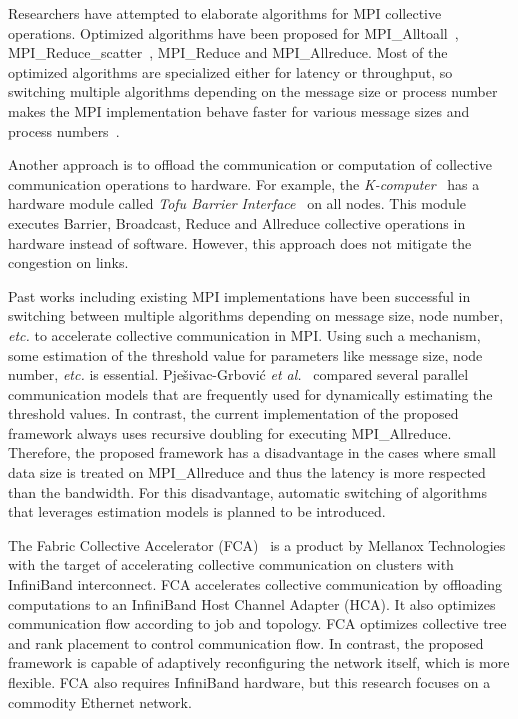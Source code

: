 Researchers have attempted to elaborate algorithms for MPI collective
operations. Optimized algorithms have been proposed for
MPI\_Alltoall~\autocite{Bruck1997},
MPI\_Reduce\_scatter~\autocite{Iannello1997}, MPI\_Reduce and MPI\_Allreduce.
Most of the optimized algorithms are specialized either for latency or
throughput, so switching multiple algorithms depending on the message size or
process number makes the MPI implementation behave faster for various message
sizes and process numbers~\autocite{Thakur2005}.

Another approach is to offload the communication or computation of collective
communication operations to hardware. For example, the
\emph{K-computer}~\autocite{Yokokawa2011} has a hardware module called
\emph{Tofu Barrier Interface}~\autocite{Ajima2012} on all nodes. This module
executes Barrier, Broadcast, Reduce and Allreduce collective operations in
hardware instead of software. However, this approach does not mitigate
the congestion on links.

Past works including existing MPI implementations have been successful in
switching between multiple algorithms depending on message size, node number,
\emph{etc.} to accelerate collective communication in MPI\@. Using such a
mechanism, some estimation of the threshold value for parameters like message
size, node number, \emph{etc.} is essential. Pje\v{s}ivac-Grbovi\'{c} \emph{et
al.}~\autocite{PjesivacGrbovic2007} compared several parallel communication
models that are frequently used for dynamically estimating the threshold
values. In contrast, the current implementation of the proposed framework
always uses recursive doubling for executing MPI\_Allreduce. Therefore, the
proposed framework has a disadvantage in the cases where small data size is
treated on MPI\_Allreduce and thus the latency is more respected than the
bandwidth. For this disadvantage, automatic switching of algorithms that
leverages estimation models is planned to be introduced.

The Fabric Collective Accelerator (FCA)~\autocite{fca} is a product by
Mellanox Technologies with the target of accelerating collective
communication on clusters with InfiniBand interconnect. FCA accelerates
collective communication by offloading computations to an InfiniBand
Host Channel Adapter (HCA). It also optimizes communication flow
according to job and topology. FCA optimizes collective tree and rank
placement to control communication flow. In contrast, the proposed
framework is capable of adaptively reconfiguring the network itself,
which is more flexible. FCA also requires InfiniBand hardware, but this
research focuses on a commodity Ethernet network.

